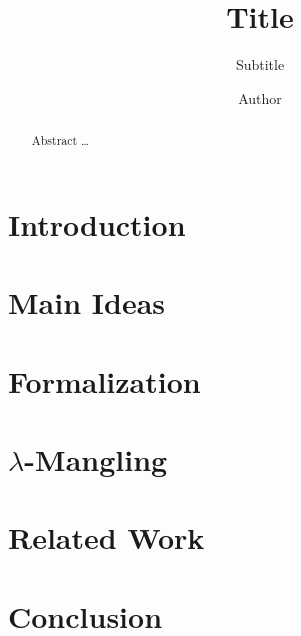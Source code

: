 \documentclass[acmsmall,nonacm=true,screen=true,timestamp=true]{acmart}
\begin{document}
\title{Title}
\subtitle{Subtitle}
\author{Author}

\begin{abstract}
  Abstract \ldots
\end{abstract}

\maketitle



\section{Introduction}
\label{sec:intro}


\section{Main Ideas}
\label{sec:mainideas}


\section{Formalization}
\label{sec:formalization}


\section{$\lambda$-Mangling}
\label{sec:lammangle}


\section{Related Work}
\label{sec:relatedwork}


\section{Conclusion}
\label{sec:conclusion}



\end{document}
